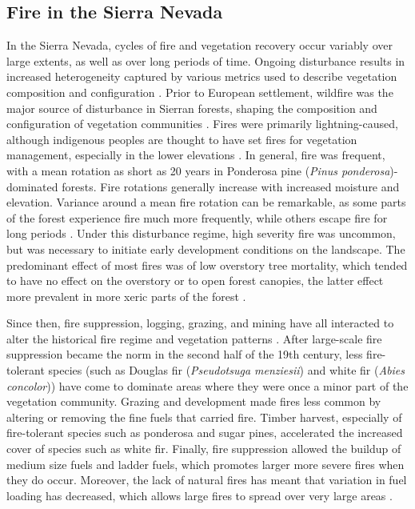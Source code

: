 \subsection{Fire in the Sierra Nevada}
In the Sierra Nevada, cycles of fire and vegetation recovery occur variably over large extents, as well as over long periods of time. Ongoing disturbance results in increased heterogeneity captured by various metrics used to describe vegetation composition and configuration \citep{Monica2008}. Prior to European settlement, wildfire was the major source of disturbance in Sierran forests, shaping the composition and configuration of vegetation communities \citep{SNEP1996a}. Fires were primarily lightning-caused, although indigenous peoples are thought to have set fires for vegetation management, especially in the lower elevations \citep{Anderson1996}. In general, fire was frequent, with a mean rotation as short as 20 years in Ponderosa pine (\emph{Pinus ponderosa})-dominated forests. Fire rotations generally increase with increased moisture and elevation. Variance around a mean fire rotation can be remarkable, as some parts of the forest experience fire much more frequently, while others escape fire for long periods \citep{Mallek2013}. Under this disturbance regime, high severity fire was uncommon, but was necessary to initiate early development conditions on the landscape. The predominant effect of most fires was of low overstory tree mortality, which tended to have no effect on the overstory or to open forest canopies, the latter effect more prevalent in more xeric parts of the forest \citep{Skinner1996,Safford2014,SNEP1996,SNEP1996a}.

Since then, fire suppression, logging, grazing, and mining have all interacted to alter the historical fire regime and vegetation patterns \citep{Stephens2015,Knapp2013}. After large-scale fire suppression became the norm in the second half of the 19th century, less fire-tolerant species (such as Douglas fir (\emph{Pseudotsuga menziesii}) and white fir (\emph{Abies concolor})) have come to dominate areas where they were once a minor part of the vegetation community. Grazing and development made fires less common by altering or removing the fine fuels that carried fire. Timber harvest, especially of fire-tolerant species such as ponderosa and sugar pines, accelerated the increased cover of species such as white fir. Finally, fire suppression allowed the buildup of medium size fuels and ladder fuels, which promotes larger more severe fires when they do occur. Moreover, the lack of natural fires has meant that variation in fuel loading has decreased, which allows large fires to spread over very large areas \citep{Hessburg2005,Beaty2007,Meyer2008}.




